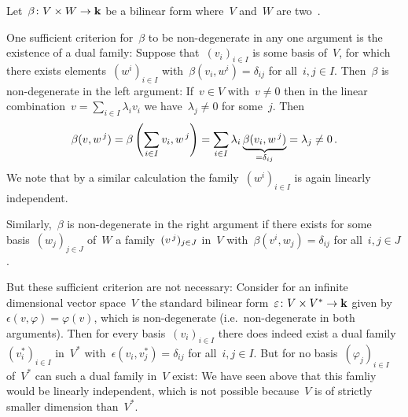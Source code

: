 \begin{recall}
  Let~$\beta \colon V \times W \to \mathbf{k}$ be a bilinear form where~$V$ and~$W$ are two~{\vectorspaces{$\kf$}}.
  
  One sufficient criterion for~$\beta$ to be non-degenerate in any one argument is the existence of a dual family:
  Suppose that~$(v_i)_{i \in I}$ is some basis of~$V$, for which there exists elements~$(w^i)_{i \in I}$ with~$\beta(v_i, w^i) = \delta_{ij}$ for all~$i, j \in I$.
  Then~$\beta$ is non-degenerate in the left argument:
  If~$v \in V$ with~$v \neq 0$ then in the linear combination~$v = \sum_{i \in I} \lambda_i v_i$ we have~$\lambda_j \neq 0$ for some~$j$.
  Then
  \[
    \beta(v, w^{\, j})
    =
    \beta\left( \sum_{i \in I} v_i, w^{\, j} \right)
    =
    \sum_{i \in I} \lambda_i \underbrace{\beta(v_i, w^{\, j})}_{= \delta_{ij}}
    =
    \lambda_j
    \neq
    0 \,.
  \]
  We note that by a similar calculation the family~$(w^i)_{i \in I}$ is again linearly independent.
  
  Similarly,~$\beta$ is non-degenerate in the right argument if there exists for some basis~$(w_j)_{j \in J}$ of~$W$ a family~$(v^{\, j})_{j \in J}$ in~$V$ with~$\beta(v^i, w_j) = \delta_{ij}$ for all~$i, j \in J$.
  
  But these sufficient criterion are not necessary:
  Consider for an infinite dimensional vector space~$V$ the standard bilinear form~$\varepsilon \colon V \times V^* \to \mathbf{k}$ given by~$\epsilon(v, \varphi) = \varphi(v)$, which is non-degenerate (i.e.\ non-degenerate in both arguments).
  Then for every basis~$(v_i)_{i \in I}$ there does indeed exist a dual family~$(v_i^*)_{i \in I}$ in~$V^*$ with~$\epsilon(v_i, v_j^*) = \delta_{ij}$ for all~$i, j \in I$.
  But for no basis~$(\varphi_j)_{i \in I}$ of~$V^*$ can such a dual family in~$V$ exist:
  We have seen above that this famliy would be linearly independent, which is not possible because~$V$ is of strictly smaller dimension than~$V^*$.
  

\end{recall}
